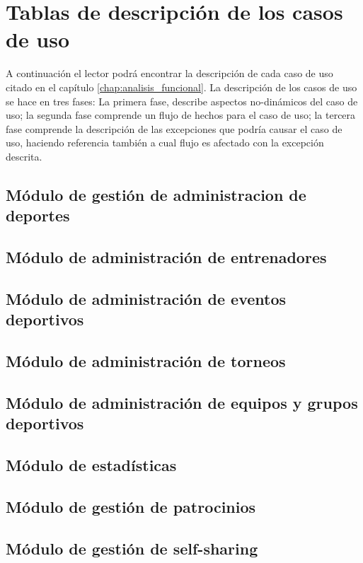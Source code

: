 \chapter{Tablas de descripción de los casos de uso}
\label{app:cu_tablas}

A continuación el lector podrá encontrar la descripción de cada caso de uso citado en el capítulo \ref{chap:analisis_funcional}. La descripción de los casos de uso se hace en tres fases: La primera fase, describe aspectos no-dinámicos del caso de uso; la segunda fase comprende un flujo de hechos para el caso de uso; la tercera fase comprende la descripción de las excepciones que podría causar el caso de uso, haciendo referencia también a cual flujo es afectado con la excepción descrita.

\section{Módulo de gestión de administracion de deportes}


\section{Módulo de administración de entrenadores}


\section{Módulo de administración de eventos deportivos}


\section{Módulo de administración de torneos}


\section{Módulo de administración de equipos y grupos deportivos}


\section{Módulo de estadísticas}


\section{Módulo de gestión de patrocinios}


\clearpage

\section{Módulo de gestión de self-sharing}
